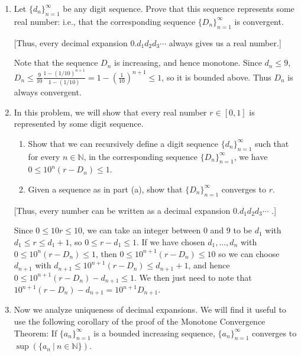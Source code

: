 \documentclass[12pt]{amsart}
\newcommand{\N}{\mathbb{N}}
\numberwithin{equation}{section}
\theoremstyle{plain} %
\theoremstyle{definition}
\theoremstyle{remark}
\begin{document}
\begin{enumerate}
\item Let $\{d_n\}_{n=1}^\infty$ be any digit sequence. Prove that this sequence represents some real number: i.e., that the corresponding sequence $\{ D_n\}_{n=1}^\infty$  is convergent. 

 [Thus, every decimal expansion $0.d_1 d_2 d_3 \cdots$ always gives us a real number.]
 
 \begin{framed}
 Note that the sequence $D_n$ is increasing, and hence monotone.
 Since $d_n\leq 9$, $D_n \leq \frac{9}{10} \frac{1- (1/10)^{n+1}}{1-(1/10)} = 1- (\frac{1}{10} )^{n+1} \leq 1$, so it is bounded above. Thus $D_n$ is always convergent.
 \end{framed}

\item In this problem, we will show that every real number $r\in [0,1]$ is represented by some digit sequence.
\begin{enumerate}
\item Show that we can recursively define a digit sequence $\{d_n\}_{n=1}^\infty$ such that for every $n\in \N$, in the corresponding sequence $\{ D_n\}_{n=1}^\infty$, we have $0 \leq 10^n (r- D_n) \leq 1$.
\item Given a sequence as in part (a), show that $\{ D_n\}_{n=1}^\infty$ converges to $r$.
\end{enumerate}

[Thus, every number can be written as a decimal expansion $0.d_1 d_2 d_3 \cdots$ .]


\begin{framed}
Since $0\leq 10 r \leq 10$, we can take an integer between $0$ and $9$ to be $d_1$ with $d_1 \leq r \leq d_1 + 1$, so $0\leq r-d_1 \leq 1$. If we have chosen $d_1,\dots,d_n$ with $0 \leq 10^n (r- D_n) \leq 1$, then $0 \leq 10^{n+1} (r- D_n) \leq 10$ so we can choose $d_{n+1}$ with $d_{n+1} \leq 10^{n+1} (r- D_n) \leq d_{n+1}+1$, and hence $0 \leq  10^{n+1} (r- D_n) - d_{n+1} \leq 1$. We then just need to note that $10^{n+1} (r- D_n) - d_{n+1} = 10^{n+1} D_{n+1}$.
\end{framed}

\item Now we analyze uniqueness of decimal expansions. We will find it useful to use the following corollary of the proof of the Monotone Convergence Theorem: If $\{a_n\}_{n=1}^\infty$ is a bounded increasing sequence, $\{a_n\}_{n=1}^\infty$ converges to $\sup (\{a_n \ | \ n\in \N\})$.


\end{enumerate}
\end{document}
